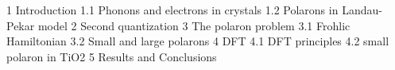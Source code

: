 

%



\frontmatter



\mainmatter






\backmatter




1 Introduction
1.1 Phonons and electrons in crystals
1.2 Polarons in Landau-Pekar model
2 Second quantization
3 The polaron problem
3.1 Frohlic Hamiltonian
3.2 Small and large polarons
4 DFT
4.1 DFT principles
4.2 small polaron in TiO2
5 Results and Conclusions